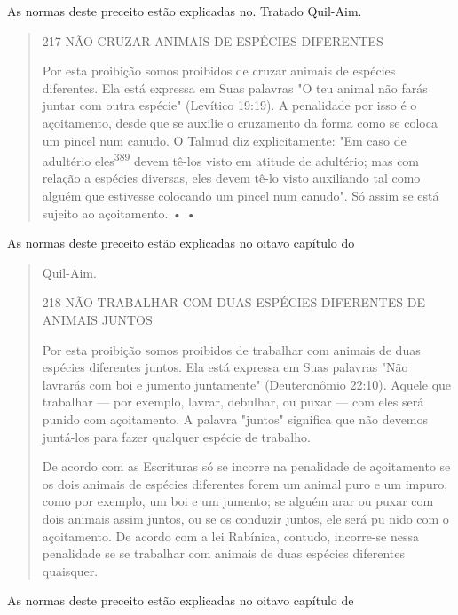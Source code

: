 As normas deste preceito estão explicadas no. Tratado Quil-Aim.

\begin{quote}
217 NÃO CRUZAR ANIMAIS DE ESPÉCIES DIFERENTES

Por esta proibição somos proibidos de cruzar animais de espécies
diferentes. Ela está expressa em Suas palavras "O teu animal não farás
juntar com outra espécie" (Levítico 19:19). A penalidade por isso é o
açoitamento, desde que se auxilie o cruzamento da forma como se coloca
um pincel num canudo. O Talmud diz explicitamente: "Em caso de adultério
eles\textsuperscript{389} devem tê-los visto em atitude de adultério;
mas com relação a espécies diversas, eles devem tê-lo visto auxiliando
tal como alguém que estivesse colocando um pin­cel num canudo". Só assim
se está sujeito ao açoitamento. • •
\end{quote}

As normas deste preceito estão explicadas no oitavo capítulo do

\begin{quote}
Quil-Aim.

218 NÃO TRABALHAR COM DUAS ESPÉCIES DIFERENTES DE ANIMAIS JUNTOS

Por esta proibição somos proibidos de trabalhar com animais de duas
espécies diferentes juntos. Ela está expressa em Suas palavras "Não
lavrarás com boi e jumento juntamente" (Deuteronômio 22:10). 
Aquele que trabalhar ---
por exemplo, lavrar, debulhar, ou puxar --- com eles será punido com
açoitamen­to. A palavra "juntos" significa que não devemos juntá-los
para fazer qualquer espécie de trabalho.

De acordo com as Escrituras só se incorre na penalidade de açoi­tamento
se os dois animais de espécies diferentes forem um animal puro e um
impuro, como por exemplo, um boi e um jumento; se alguém arar ou puxar
com dois animais assim juntos, ou se os conduzir juntos, ele será pu
nido com o açoitamento. De acordo com a lei Rabínica, contudo,
incorre-se nessa penalidade se se trabalhar com animais de duas espécies
diferentes quaisquer.
\end{quote}

As normas deste preceito estão explicadas no oitavo capítulo de

